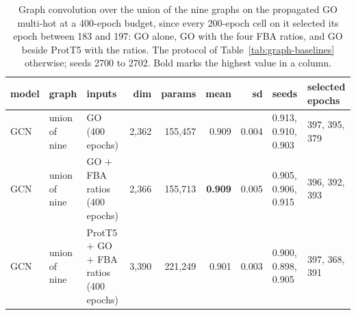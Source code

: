 \begin{table}[H]
  \centering
  \footnotesize
  \caption[Graph convolution on GO, 400 epochs]{Graph convolution over the union of the nine graphs on the propagated GO multi-hot at a 400-epoch budget, since every 200-epoch cell on it selected its epoch between 183 and 197: GO alone, GO with the four FBA ratios, and GO beside ProtT5 with the ratios. The protocol of Table~\ref{tab:graph-baselines} otherwise; seeds 2700 to 2702. Bold marks the highest value in a column.}
  \label{tab:graph-go400}
  \begin{tabular}{@{}lllrrrrll@{}}
    \hline
    model & graph & inputs & dim & params & mean & sd & seeds & selected epochs \\
    \hline
    GCN & union of nine & GO (400 epochs) & 2,362 & 155,457 & 0.909 & 0.004 & 0.913, 0.910, 0.903 & 397, 395, 379 \\
    GCN & union of nine & GO $+$ FBA ratios (400 epochs) & 2,366 & 155,713 & \textbf{0.909} & 0.005 & 0.905, 0.906, 0.915 & 396, 392, 393 \\
    GCN & union of nine & ProtT5 $+$ GO $+$ FBA ratios (400 epochs) & 3,390 & 221,249 & 0.901 & 0.003 & 0.900, 0.898, 0.905 & 397, 368, 391 \\
    \hline
  \end{tabular}
\end{table}
